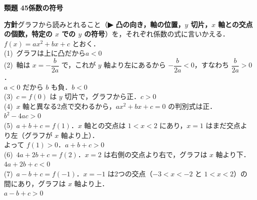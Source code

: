 \documentclass[a4paper,11pt]{ltjsarticle}
\newcommand{\ans}[2]{\Needspace{5\baselineskip}\vspace{6pt}%
  {\sffamily\bfseries 類題 #1\quad #2}\par}
\newcommand{\point}[1]{\textsf{\bfseries ▶ #1}}
\begin{document}
\ans{45}{係数の符号}
\begin{kai}
\textbf{方針}\quad グラフから読みとれること（\point{凸の向き，軸の位置，$y$ 切片，$x$ 軸との交点の個数，特定の $x$ での $y$ の符号}）を，それぞれ係数の式に言いかえる．$f(x)=ax^2+bx+c$ とおく．\\[2pt]
(1)\ グラフは上に凸だから\quad $a<0$\\[2pt]
(2)\ 軸は $x=-\dfrac{b}{2a}$ で，これが $y$ 軸より左にあるから $-\dfrac{b}{2a}<0$，すなわち $\dfrac{b}{2a}>0$．\\
\hspace*{1.5em}$a<0$ だから $b$ も負．\quad $b<0$\\[2pt]
(3)\ $c=f(0)$ は $y$ 切片で，グラフから正．\quad $c>0$\\[2pt]
(4)\ $x$ 軸と異なる2点で交わるから，$ax^2+bx+c=0$ の判別式は正．\quad $b^2-4ac>0$\\[2pt]
(5)\ $a+b+c=f(1)$．$x$ 軸との交点は $1<x<2$ にあり，$x=1$ はまだ交点より左（グラフが $x$ 軸より上）．\\
\hspace*{1.5em}よって $f(1)>0$．\quad $a+b+c>0$\\[2pt]
(6)\ $4a+2b+c=f(2)$．$x=2$ は右側の交点より右で，グラフは $x$ 軸より下．\quad $4a+2b+c<0$\\[2pt]
(7)\ $a-b+c=f(-1)$．$x=-1$ は2つの交点（$-3<x<-2$ と $1<x<2$）の間にあり，グラフは $x$ 軸より上．\\
\hspace*{1.5em}$a-b+c>0$
\end{kai}
\end{document}
